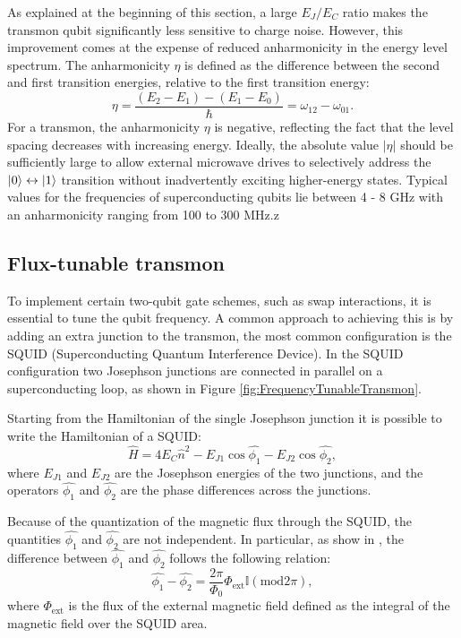 As explained at the beginning of this section, a large $E_J/E_C$ ratio makes the transmon qubit significantly less sensitive to charge noise. 
However, this improvement comes at the expense of reduced anharmonicity in the energy level spectrum. 
The anharmonicity $\eta$ is defined as the difference between the second and first transition energies, relative to the first transition energy:
\begin{equation}
    \eta = \frac{(E_2 - E_1) - (E_1 - E_0)}{\hbar} = \omega_{12} - \omega_{01}.
\end{equation}
For a transmon, the anharmonicity $\eta$ is negative, reflecting the fact that the level spacing decreases with increasing energy. 
Ideally, the absolute value  $|\eta|$ should be sufficiently large to allow external microwave drives to selectively address the $\ket{0}\leftrightarrow\ket{1}$ transition without inadvertently exciting higher-energy states.
Typical values for the frequencies of superconducting qubits lie between 4 - 8 GHz with an anharmonicity ranging from 100 to 300 MHz.z

\subsection{Flux-tunable transmon}\label{subsec:flux_tunable_transmon}
To implement certain two-qubit gate schemes, such as swap interactions, it is essential to tune the qubit frequency. 
A common approach to achieving this is by adding an extra junction to the transmon, the most common configuration is the SQUID (Superconducting Quantum Interference Device).
In the SQUID configuration two Josephson junctions are connected in parallel on a superconducting loop, as shown in Figure \ref{fig:FrequencyTunableTransmon}.

Starting from the Hamiltonian of the single Josephson junction it is possible to write the Hamiltonian of a SQUID:
\begin{equation}\label{eq:SQUID_Hamiltonian}
    \hat{H} = 4E_C\hat{n}^2 - E_{J1}\cos{\hat{\phi_1}} - E_{J2}\cos{\hat{\phi_2}},
\end{equation}
where $E_{J1}$ and $E_{J2}$ are the Josephson energies of the two junctions, and the operators $\hat{\phi_1}$ and $\hat{\phi_2}$ are the phase differences across the junctions.

Because of the quantization of the magnetic flux through the SQUID, the quantities $\hat{\phi_1}$ and $\hat{\phi_2}$ are not independent. 
In particular, as show in \cite{manenti_quantum_2023}, the difference between $\hat{\phi_1}$ and $\hat{\phi_2}$ follows the following relation:
\begin{equation}\label{eq:phases_relation}
    \hat{\phi_1} - \hat{\phi_2} = \frac{2\pi}{\Phi_0}\Phi_{\text{ext}}\mathbb{I}(\text{mod}2\pi),
\end{equation}
where $\Phi_{\text{ext}}$ is the flux of the external magnetic field defined as the integral of the magnetic field over the SQUID area.

